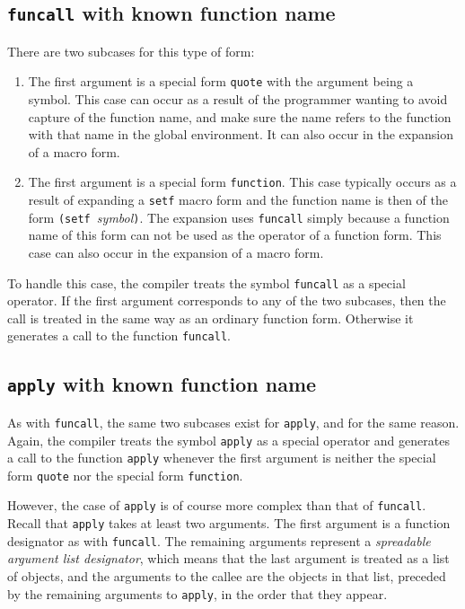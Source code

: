 \subsection{\texttt{funcall} with known function name}

There are two subcases for this type of form:

\begin{enumerate}
\item The first argument is a special form \texttt{quote} with the
  argument being a symbol.  This case can occur as a result of the
  programmer wanting to avoid capture of the function name, and make
  sure the name refers to the function with that name in the global
  environment.  It can also occur in the expansion of a macro form.
\item The first argument is a special form \texttt{function}.  This
  case typically occurs as a result of expanding a \texttt{setf} macro
  form and the function name is then of the form \texttt{(setf
  }\textit{symbol}\texttt{)}.  The expansion uses \texttt{funcall}
  simply because a function name of this form can not be used as the
  operator of a function form.  This case can also occur in the
  expansion of a macro form.
\end{enumerate}

To handle this case, the compiler treats the symbol \texttt{funcall}
as a special operator.  If the first argument corresponds to any of
the two subcases, then the call is treated in the same way as an
ordinary function form.  Otherwise it generates a call to the function
\texttt{funcall}.

\subsection{\texttt{apply} with known function name}

As with \texttt{funcall}, the same two subcases exist for
\texttt{apply}, and for the same reason.  Again, the compiler treats
the symbol \texttt{apply} as a special operator and generates a call
to the function \texttt{apply} whenever the first argument is neither
the special form \texttt{quote} nor the special form
\texttt{function}.

However, the case of \texttt{apply} is of course more complex than
that of \texttt{funcall}.  Recall that \texttt{apply} takes at least
two arguments.  The first argument is a function designator as with
\texttt{funcall}.  The remaining arguments represent a
\emph{spreadable argument list designator}, which means that the last
argument is treated as a list of objects, and the arguments to the
callee are the objects in that list, preceded by the remaining
arguments to \texttt{apply}, in the order that they appear.

